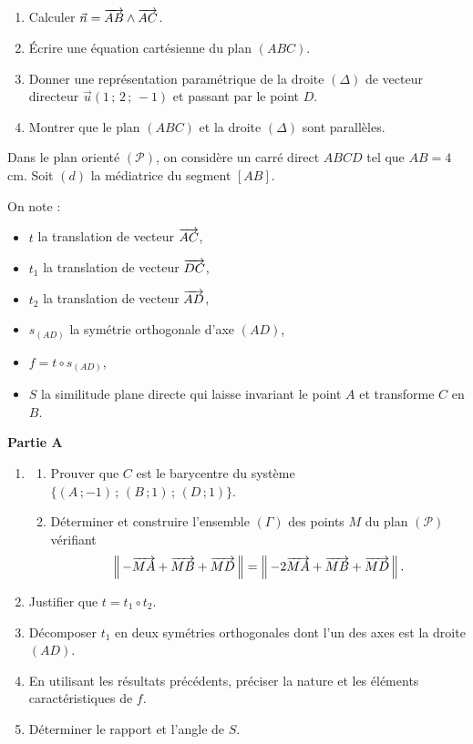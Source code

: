 \begin{enumerate}
	\item Calculer $\vec{n} = \overrightarrow{AB} \wedge \overrightarrow{AC}$.
	\item Écrire une équation cartésienne du plan $(ABC)$.
	\item Donner une représentation paramétrique de la droite $(\Delta)$ de vecteur directeur
	$\vec{u}(1\,;\,2\,;\,-1)$ et passant par le point $D$.
	\item Montrer que le plan $(ABC)$ et la droite $(\Delta)$ sont parallèles.
\end{enumerate}




Dans le plan orienté $(\mathscr{P})$, on considère un carré direct $ABCD$ tel que $AB = 4$ cm.
Soit $(d)$ la médiatrice du segment $[AB]$.

On note :
\begin{itemize}[label=\textbullet]
	\item $t$ la translation de vecteur $\overrightarrow{AC}$,
	\item $t_1$ la translation de vecteur $\overrightarrow{DC}$,
	\item $t_2$ la translation de vecteur $\overrightarrow{AD}$,
	\item $s_{(AD)}$ la symétrie orthogonale d'axe $(AD)$,
	\item $f = t \circ s_{(AD)}$,
	\item $S$ la similitude plane directe qui laisse invariant le point $A$ et transforme $C$ en $B$.
\end{itemize}

\medskip
\noindent\textbf{Partie A}

\begin{enumerate}
	\item
	\begin{enumerate}
		\item Prouver que $C$ est le barycentre du système $\{(A\,;-1)\,;\,(B\,;1)\,;\,(D\,;1)\}$.
		\item Déterminer et construire l'ensemble $(\Gamma)$ des points $M$ du plan $(\mathscr{P})$ vérifiant
		$$
		\left\|\,-\overrightarrow{MA} + \overrightarrow{MB} + \overrightarrow{MD}\,\right\|
		=
		\left\|\,-2\overrightarrow{MA} + \overrightarrow{MB} + \overrightarrow{MD}\,\right\|.
		$$
	\end{enumerate}
	\item Justifier que $t = t_1 \circ t_2$.
	\item Décomposer $t_1$ en deux symétries orthogonales dont l'un des axes est la droite $(AD)$.
	\item En utilisant les résultats précédents, préciser la nature et les éléments caractéristiques de $f$.
	\item Déterminer le rapport et l'angle de $S$.
\end{enumerate}

